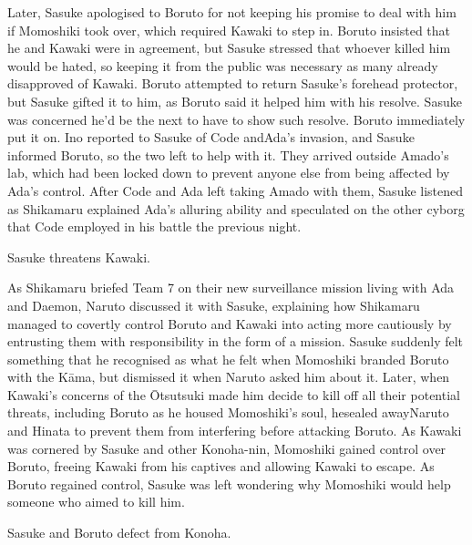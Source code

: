 \documentclass[a4paper,12pt]{article}
\begin{document}
Later, Sasuke apologised to Boruto for not keeping his promise to deal with him if Momoshiki took over, which required Kawaki to step in. Boruto insisted that he and Kawaki were in agreement, but Sasuke stressed that whoever killed him would be hated, so keeping it from the public was necessary as many already disapproved of Kawaki. Boruto attempted to return Sasuke's forehead protector, but Sasuke gifted it to him, as Boruto said it helped him with his resolve. Sasuke was concerned he'd be the next to have to show such resolve. Boruto immediately put it on. Ino reported to Sasuke of Code andAda's invasion, and Sasuke informed Boruto, so the two left to help with it. They arrived outside Amado's lab, which had been locked down to prevent anyone else from being affected by Ada's control. After Code and Ada left taking Amado with them, Sasuke listened as Shikamaru explained Ada's alluring ability and speculated on the other cyborg that Code employed in his battle the previous night.\\ \par \vspace{0.5cm}

Sasuke threatens Kawaki.\\ \par \vspace{0.5cm}

As Shikamaru briefed Team 7 on their new surveillance mission living with Ada and Daemon, Naruto discussed it with Sasuke, explaining how Shikamaru managed to covertly control Boruto and Kawaki into acting more cautiously by entrusting them with responsibility in the form of a mission. Sasuke suddenly felt something that he recognised as what he felt when Momoshiki branded Boruto with the Kāma, but dismissed it when Naruto asked him about it. Later, when Kawaki's concerns of the Ōtsutsuki made him decide to kill off all their potential threats, including Boruto as he housed Momoshiki's soul, hesealed awayNaruto and Hinata to prevent them from interfering before attacking Boruto. As Kawaki was cornered by Sasuke and other Konoha-nin, Momoshiki gained control over Boruto, freeing Kawaki from his captives and allowing Kawaki to escape. As Boruto regained control, Sasuke was left wondering why Momoshiki would help someone who aimed to kill him.\\ \par \vspace{0.5cm}

Sasuke and Boruto defect from Konoha.\\ \par \vspace{0.5cm}
\end{document}
